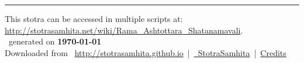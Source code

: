 \documentclass[oneside,12pt]{book}
\begin{document}
\setmainfont[Script=Devanagari,Mapping=tex-text]{Sanskrit 2003}
\fontsize {16}{19.25}\selectfont
\begin{center}

\end{center}
\vfill
\centering
\rule{0.8\textwidth}{0.6pt}

\footnotesize
{}\sffamily
This stotra can be accessed in multiple scripts at:\\
\url{http://stotrasamhita.net/wiki/Rama_Ashtottara_Shatanamavali}.\\[1ex]
\faFilePdfO~generated on \textbf{\today}\\[1ex]
Downloaded from \faGlobe{}~\url{http://stotrasamhita.github.io}~|~\href{https://github.com/StotraSamhita}{\faGithubSquare{}~StotraSamhita}~|~\href{https://stotrasamhita.github.io/about/}{Credits}
\end{document}
